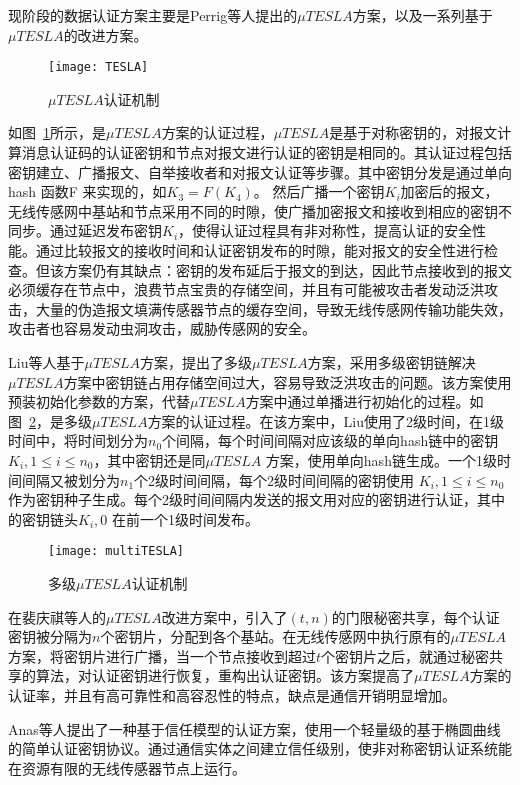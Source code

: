 现阶段的数据认证方案主要是Perrig等人提出的$\mu TESLA$方案，以及一系列基于$\mu TESLA$的改进方案。
\begin{figure}[htbp]
  \centering
  \texttt{[image: TESLA]}
  \caption{$\mu TESLA$认证机制}
  \label{fig:TESLA}
\end{figure}
如图~\ref{fig:TESLA}所示，是$\mu TESLA$方案的认证过程，$\mu TESLA$是基于对称密钥的，对报文计算消息认证码的认证密钥和节点对报文进行认证的密钥是相同的。其认证过程包括密钥建立、广播报文、自举接收者和对报文认证等步骤。其中密钥分发是通过单向hash 函数F 来实现的，如$K_3=F(K_4)$。 然后广播一个密钥$K_i$加密后的报文，无线传感网中基站和节点采用不同的时隙，使广播加密报文和接收到相应的密钥不同步。通过延迟发布密钥$K_i$，使得认证过程具有非对称性，提高认证的安全性能。通过比较报文的接收时间和认证密钥发布的时隙，能对报文的安全性进行检查。但该方案仍有其缺点：密钥的发布延后于报文的到达，因此节点接收到的报文必须缓存在节点中，浪费节点宝贵的存储空间，并且有可能被攻击者发动泛洪攻击，大量的伪造报文填满传感器节点的缓存空间，导致无线传感网传输功能失效，攻击者也容易发动虫洞攻击，威胁传感网的安全。

Liu等人基于$\mu TESLA$方案，提出了多级$\mu TESLA$方案，采用多级密钥链解决$\mu TESLA$方案中密钥链占用存储空间过大，容易导致泛洪攻击的问题。该方案使用预装初始化参数的方案，代替$\mu TESLA$方案中通过单播进行初始化的过程。如图~\ref{fig:MultiTESLA}，是多级$\mu TESLA$方案的认证过程。在该方案中，Liu使用了2级时间，在1级时间中，将时间划分为$n_0$个间隔，每个时间间隔对应该级的单向hash链中的密钥$K_i,1\leq i \leq n_0$，其中密钥还是同$\mu TESLA$ 方案，使用单向hash链生成。一个1级时间间隔又被划分为$n_1$个2级时间间隔，每个2级时间间隔的密钥使用
$K_i,1\leq i \leq n_0$作为密钥种子生成。每个2级时间间隔内发送的报文用对应的密钥进行认证，其中的密钥链头$K_i,0$ 在前一个1级时间发布。
\begin{figure}[htbp]
  \centering
  \texttt{[image: multiTESLA]}
  \caption{多级$\mu TESLA$认证机制}
  \label{fig:MultiTESLA}
\end{figure}

在裴庆祺等人的$\mu TESLA$改进方案中，引入了$(t,n)$的门限秘密共享，每个认证密钥被分隔为$n$个密钥片，分配到各个基站。在无线传感网中执行原有的$\mu TESLA$方案，将密钥片进行广播，当一个节点接收到超过$t$个密钥片之后，就通过秘密共享的算法，对认证密钥进行恢复，重构出认证密钥。该方案提高了$\mu TESLA$方案的认证率，并且有高可靠性和高容忍性的特点，缺点是通信开销明显增加。

Anas等人提出了一种基于信任模型的认证方案，使用一个轻量级的基于椭圆曲线的简单认证密钥协议。通过通信实体之间建立信任级别，使非对称密钥认证系统能在资源有限的无线传感器节点上运行。

